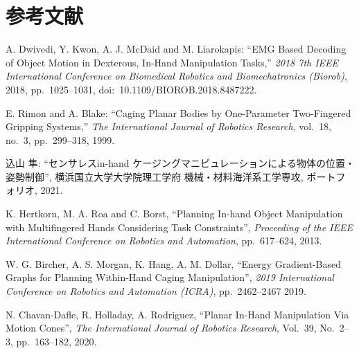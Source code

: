\documentclass[a4paper,twoside,12pt,papersize, dvipdfmx]{iirthesis}
\begin{document}
    \newcommand{\figref}[1]{\figurename\ref{#1}}
    \newcommand{\tabref}[1]{\tablename\ref{#1}}
    \renewcommand{\eqref}[1]{式~(\ref{#1})}
    \newcommand{\chapref}[1]{\ref{#1}章}
    \newcommand{\secref}[1]{\ref{#1}節}
    \newcommand{\ssecref}[1]{\ref{#1}項}
    \newcommand{\appref}[1]{付録\ref{#1}}
\fi

\chapter{参考文献}\label{chap:bibliography}

\begin{thebibliography}{}
A. Dwivedi, Y. Kwon, A. J. McDaid and M. Liarokapis:
``EMG Based Decoding of Object Motion in Dexterous, In-Hand Manipulation Tasks,''
{\it 2018 7th IEEE International Conference on Biomedical Robotics and Biomechatronics (Biorob)},
2018, pp.~1025--1031, doi:~10.1109/BIOROB.2018.8487222.

E. Rimon and A. Blake:
``Caging Planar Bodies by One-Parameter Two-Fingered Gripping Systems,''
{\it The International Journal of Robotics Research}, vol.~18, no.~3, pp.~299--318, 1999.

込山 隼:
``センサレスin-hand ケージングマニピュレーションによる物体の位置・姿勢制御'',
横浜国立大学大学院理工学府 機械・材料海洋系工学専攻, ポートフォリオ, 2021.
  
K. Hertkorn, M. A. Roa and C. Borst,
``Planning In-hand Object Manipulation with Multifingered Hands Considering Task Constraints'',
{\it Proceeding of the IEEE International Conference on Robotics and Automation}, 
pp.~617--624, 2013.

	W. G. Bircher, A. S. Morgan, K. Hang, A. M. Dollar,
  	``Energy Gradient-Based Graphs for Planning Within-Hand Caging Manipulation'',
  	{\it 2019 International Conference on Robotics and Automation (ICRA)},
  	pp.~2462--2467
  	2019.
    
 	N. Chavan-Dafle, R. Holladay, A. Rodriguez,
  	``Planar In-Hand Manipulation Via Motion Cones'',
  	 {\it The International Journal of Robotics Research},
  	 Vol.~39, No.~2--3, pp.~163--182,
  	2020.
  	

\end{thebibliography}
\end{document}
